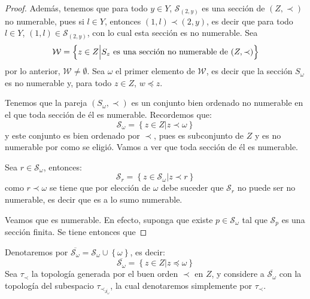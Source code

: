 \documentclass[12pt]{report}
\theoremstyle{largebreak}
\newcommand{\Cls}[1]{\ensuremath{\overline{#1}}}
\begin{document}
\begin{proof}
        Además, tenemos que para todo $y\in Y$, $\mathcal{S}_{(2,y)}$ es una sección de $(Z,\prec)$ no numerable, pues si $l\in Y$, entonces $(1,l)\prec (2,y)$, es decir que para todo $l\in Y$, $(1,l)\in\mathcal{S}_{(2,y)}$, con lo cual esta sección es no numerable. Sea
        \begin{equation*}
            \mathcal{W}=\left\{z\in Z\Big|S_z\textup{ es una sección no numerable de }(Z,\prec) \right\}
        \end{equation*}
        por lo anterior, $\mathcal{W}\neq\emptyset$. Sea $\omega$ el primer elemento de $\mathcal{W}$, es decir que la sección $S_\omega$ es no numerable y, para todo $z\in Z$, $w\preceq z$.
        
        Tenemos que la pareja $(S_\omega, \prec)$ es un conjunto bien ordenado no numerable en el que toda sección de él es numerable. Recordemos que:
        \begin{equation*}
            \mathcal{S}_\omega=\left\{z\in Z\Big|z\prec\omega \right\}
        \end{equation*}
        y este conjunto es bien ordenado por $\prec$, pues es subconjunto de $Z$ y es no numerable por como se eligió. Vamos a ver que toda sección de él es numerable.

        Sea $r\in\mathcal{S}_\omega$, entonces:
        \begin{equation*}
            \mathcal{S}_r=\left\{z\in\mathcal{S}_\omega\Big|z\prec r \right\}
        \end{equation*}
        como $r\prec\omega$ se tiene que por elección de $\omega$ debe suceder que $\mathcal{S}_r$ no puede ser no numerable, es decir que es a lo sumo numerable.

        Veamos que es numerable. En efecto, suponga que existe $p\in\mathcal{S}_\omega$ tal que $\mathcal{S}_p$ es una sección finita. Se tiene entonces que
    \end{proof}

    \begin{obs}
        Denotaremos por $\Cls{\mathcal{S}_\omega}=\mathcal{S}_\omega\cup\left\{\omega \right\}$, es decir:
        \begin{equation*}
            \Cls{\mathcal{S}_\omega}=\left\{z\in Z\Big|z\preceq\omega \right\}
        \end{equation*}
        Sea $\tau_\prec$ la topología generada por el buen orden $\prec$ en $Z$, y considere a $\Cls{\mathcal{S}_\omega}$ con la topología del subespacio $\tau_{\prec_{\Cls{\mathcal{S}_\omega}}}$, la cual denotaremos simplemente por $\tau_\prec$.
    \end{obs}
\end{document}
